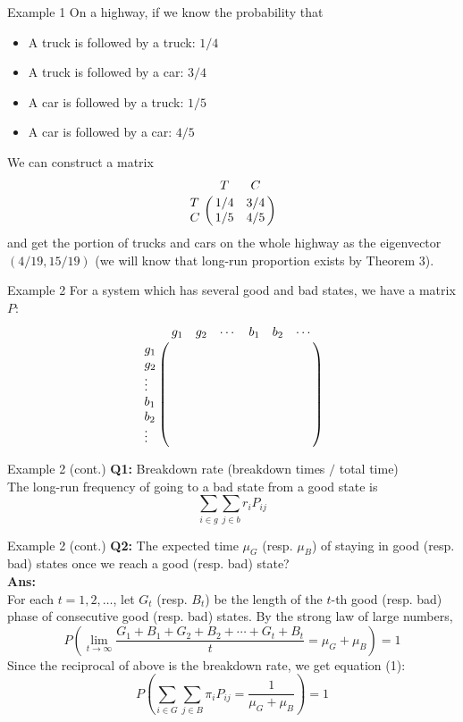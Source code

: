 \documentclass[mathserif]{beamer}
\begin{document}
\begin{frame}{Example 1}
	On a highway, if we know the probability that
	\begin{itemize}
	\item A truck is followed by a truck: $1/4$
	\item A truck is followed by a car: $3/4$
	\item A car is followed by a truck: $1/5$
	\item A car is followed by a car: $4/5$
	\end{itemize}
	We can construct a matrix
	\[
	\bordermatrix{~ & T   & C   \cr
                  T & 1/4 & 3/4 \cr
                  C & 1/5 & 4/5 \cr}
	\]
	and get the portion of trucks and cars on the whole highway as the eigenvector $(4/19, 15/19)$
	(we will know that long-run proportion exists by Theorem 3).
\end{frame}

\begin{frame}{Example 2}
	For a system which has several good and bad states, we have a matrix $P$:
	\[
	\bordermatrix{~      & g_1 & g_2 & \cdots & b_1 & b_2 & \cdots \cr
                  g_1    &     &     &        &     &     &        \cr
                  g_2    &     &     &        &     &     &        \cr
                  \vdots &     &     &        &     &     &        \cr
                  b_1    &     &     &        &     &     &        \cr
                  b_2    &     &     &        &     &     &        \cr
                  \vdots &     &     &        &     &     &        \cr}
	\]
\end{frame}

\begin{frame}{Example 2 (cont.)}
	\textbf{Q1:} Breakdown rate (breakdown times $/$ total time)\\
	The long-run frequency of going to a bad state from a good state is
	\[
	\sum_{i \in g} \sum_{j \in b} r_i P_{ij}
	\]
\end{frame}

\begin{frame}{Example 2 (cont.)}
	\textbf{Q2:} The expected time $\mu_G$ (resp. $\mu_B$) of staying in good (resp. bad) states once we reach a good (resp. bad) state? \\
	\textbf{Ans:} \\
	For each $t = 1, 2, \ldots$, let $G_t$ (resp. $B_t$) be the length of the $t$-th good (resp. bad) phase of consecutive good (resp. bad) states.
	By the strong law of large numbers, 
	\[
	P\left( \lim_{t\to\infty} \frac{G_1 + B_1 + G_2 + B_2 + \cdots + G_t + B_t}{t} = \mu_G + \mu_B \right) = 1
	\]
	Since the reciprocal of above is the breakdown rate, we get equation (1):
	\[
	P\left( \sum_{i \in G} \sum_{j \in B} \pi_i P_{ij} = \frac{1}{\mu_G + \mu_B} \right) = 1
	\]
\end{frame}
\end{document}

